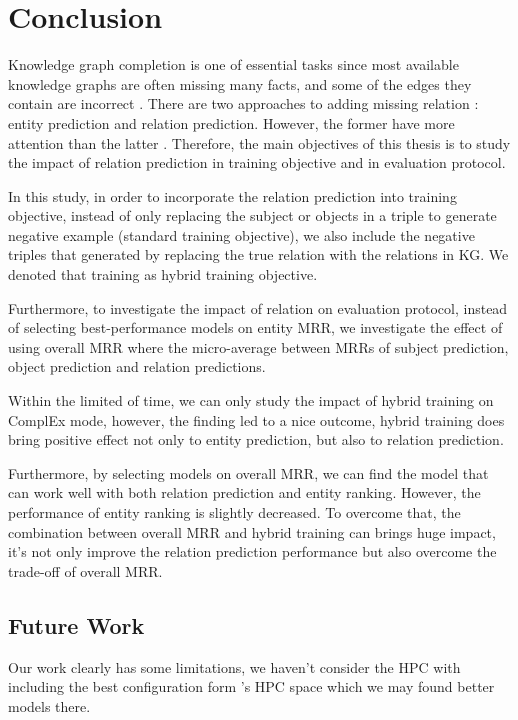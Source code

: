 \chapter{Conclusion}
\label{cha:conclusion}


Knowledge graph completion is one of essential tasks since most available knowledge graphs are often missing many facts, and some of the edges they contain are incorrect \cite{angeli2013philosophers}. There are two approaches to adding missing relation \cite{wang2017knowledge}: entity prediction and relation prediction. However, the former have more attention than the latter \cite{chang2020benchmark}.
Therefore, the main objectives of this thesis is to study the impact of relation prediction in training objective and in evaluation protocol.  

In this study, in order to incorporate the relation prediction into training objective, instead of only replacing the subject or objects in a triple to generate negative example (standard training objective), we also include the negative triples that generated by replacing the true relation with the relations in KG. We denoted that training as hybrid training objective. 

Furthermore, to investigate the impact of relation on evaluation protocol, instead of selecting best-performance models on entity MRR, we investigate the effect of using overall MRR where the micro-average between MRRs of subject prediction, object prediction and relation predictions. 

Within the limited of time, we can only study the impact of hybrid training on ComplEx mode, however, the finding led to a nice outcome, hybrid training does bring positive effect not only to entity prediction, but also to relation prediction. 

Furthermore, by selecting models on overall MRR, we can find the model that can work well with both relation prediction and entity ranking. However, the performance of entity ranking is slightly decreased. To overcome that, the combination between overall MRR and hybrid training can brings huge impact, it's not only improve the relation prediction performance but also overcome the trade-off of overall MRR. 


\section{Future Work}
\label{sec:future}

Our work clearly has some limitations, we haven't consider the HPC with including the best configuration form \cite{chen2021relation}'s HPC space which we may found better models there. 

